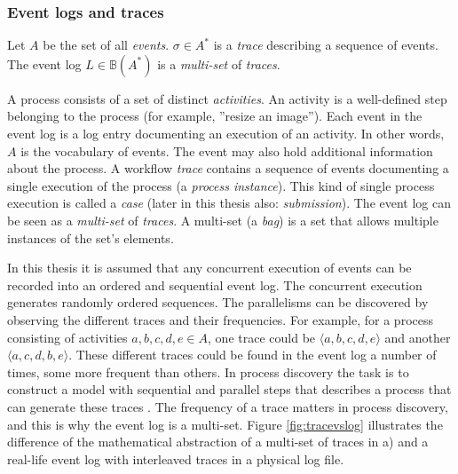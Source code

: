 \subsubsection{Event logs and traces}

\label{sec:eventtheory}

\begin{definition}
Let $A$ be the set of all \emph{events}. 
$\sigma \in A^*$ is a \emph{trace} describing a sequence of events.
The event log $L \in \mathbb{B}(A^*)$ is a \emph{multi-set} of \emph{traces}.
\end{definition}

A process consists of a set of distinct \emph{activities}.
An activity is a well-defined step belonging to the process (for example, ''resize an image'').
Each event in the event log is a log entry documenting an execution of an activity.
In other words, $A$ is the vocabulary of events.
The event may also hold additional information about the process.
A workflow \emph{trace} contains a sequence of events documenting a single execution of the process (a \emph{process instance}).
This kind of single process execution is called a \emph{case} (later in this thesis also: \emph{submission}).
The event log can be seen as a \emph{multi-set} of \emph{traces}. 
A multi-set (a \emph{bag}) is a set that allows multiple instances of the set's elements. \cite{van2015extracting}

In this thesis it is assumed that any concurrent execution of events can be recorded into
an ordered and sequential event log. 
The concurrent execution generates randomly ordered sequences.
The parallelisms can be discovered by observing the different traces and their frequencies.
For example, for a process consisting of activities $a,b,c,d,e \in A$, one trace could be 
$\langle a,b,c,d,e \rangle$ and another $\langle a,c,d,b,e \rangle$.
These different traces could be found in the event log a number of times, some more frequent than others.
In process discovery the task is to construct a model with sequential and parallel steps 
that describes a process that can generate these traces \cite{van2013discovering}.
The frequency of a trace matters in process discovery, and this is why the event log is a multi-set.
Figure \ref{fig:tracevslog} illustrates the difference of the mathematical abstraction of a multi-set of traces in a) and a real-life event log with interleaved traces in a physical log file.

